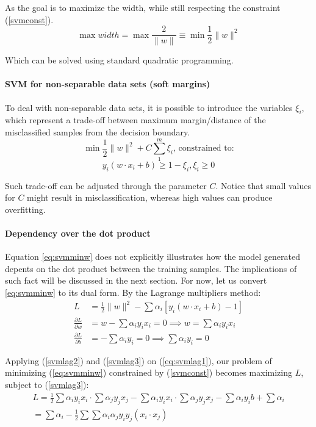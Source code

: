 \documentclass[12pt]{article}
\begin{document}
As the goal is to maximize the width, while still respecting the constraint (\ref{svmconst}).
\begin{equation} \label{eq:svmminw}
	\max width = \max \frac{2}{\|w\|} \equiv \min \frac{1}{2} \|w\|^2
\end{equation}

Which can be solved using standard quadratic programming.

\paragraph{SVM for non-separable data sets (soft margins)}

To deal with non-separable data sets, it is possible to introduce the variables $\xi_i$, \cite{wessvmdef} which represent a trade-off between maximum margin/distance of the misclassified samples from the decision boundary.
$$\min \frac{1}{2} \|w\|^2 + C \sum_{1}^{m}\xi_i \text{, constrained to:}$$
$$y_i(w \cdot x_i +b) \geq 1- \xi_i, \xi_i \geq 0$$

Such trade-off can be adjusted through the parameter $C$. Notice that small values for $C$ might result in misclassification, whereas high values can produce overfitting.

\paragraph{Dependency over the dot product}

Equation \ref{eq:svmminw} does not explicitly illustrates how the model generated depents on the dot product between the training samples. The implications of such fact will be discussed in the next section. For now, let us convert \ref{eq:svmminw} to its dual form. By the Lagrange multipliers method: \cite{mitsvm}
\begin{align} \label{eq:svmlag1}
	L &= \frac{1}{2}\|w\|^2 - \sum \alpha_i[y_i(w \cdot x_i +b) -1] \\
	\label{svmlag2}
	\frac{\partial L}{\partial w} &= w -\sum\alpha_i y_i x_i = 0 \implies w = \sum\alpha_i y_i x_i \\
	\label{svmlag3}
	\frac{\partial L}{\partial b} &= -\sum\alpha_i y_i = 0 \implies \sum\alpha_i y_i = 0
\end{align}

Applying (\ref{svmlag2}) and (\ref{svmlag3}) on (\ref{eq:svmlag1}), our problem of minimizing (\ref{eq:svmminw}) constrained by (\ref{svmconst}) becomes maximizing $L$, subject to (\ref{svmlag3}):
\begin{gather*}
L = \frac{1}{2}\sum\alpha_i y_i x_i \cdot \sum\alpha_j y_j x_j
- \sum \alpha_i y_i x_i \cdot \sum \alpha_j y_j x_j
- \sum \alpha_i y_i b + \sum \alpha_i \\
= \sum\alpha_i -\frac{1}{2}\sum\sum\alpha_i\alpha_j y_i y_j (x_i \cdot x_j)
\end{gather*}
\end{document}
